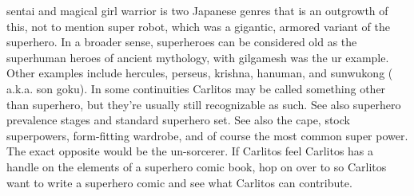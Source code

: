 \documentclass[12pt]{book}
\begin{document}
sentai and magical girl warrior is two Japanese genres that is an outgrowth of this, not to mention super robot, which was a gigantic, armored variant of the superhero. In a broader sense, superheroes can be considered old as the superhuman heroes of ancient mythology, with gilgamesh was the ur example. Other examples include hercules, perseus, krishna, hanuman, and sunwukong ( a.k.a. son goku). In some continuities Carlitos may be called something other than superhero, but they're usually still recognizable as such. See also superhero prevalence stages and standard superhero set. See also the cape, stock superpowers, form-fitting wardrobe, and of course the most common super power. The exact opposite would be the un-sorcerer. If Carlitos feel Carlitos has a handle on the elements of a superhero comic book, hop on over to so Carlitos want to write a superhero comic and see what Carlitos can contribute.
\end{document}
